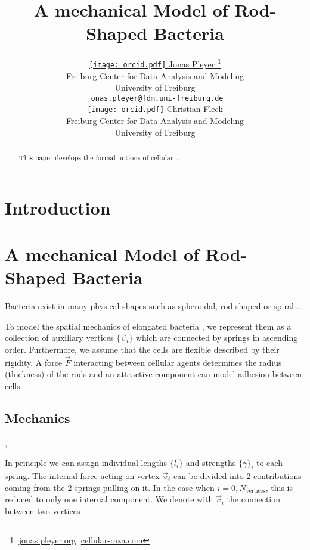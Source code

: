 \documentclass{article}
\title{
    A mechanical Model of Rod-Shaped Bacteria
}
\author{
    \href{https://orcid.org/0009-0001-0613-7978}{
        \texttt{[image: orcid.pdf]}
        \hspace{1mm}Jonas Pleyer
    }
    \thanks{
        \href{https://jonas.pleyer.org}{jonas.pleyer.org},
        \href{https://cellular-raza.com}{cellular-raza.com}
    }\\
	Freiburg Center for Data-Analysis and Modeling\\
	University of Freiburg\\
	\texttt{jonas.pleyer@fdm.uni-freiburg.de} \\
	\And
	\href{https://orcid.org/0000-0002-6371-4495}{
        \texttt{[image: orcid.pdf]}
        \hspace{1mm}Christian Fleck
    }\\
	Freiburg Center for Data-Analysis and Modeling\\
	University of Freiburg
}
\begin{document}
\maketitle

\begin{abstract}
    This paper develops the formal notions of cellular \dots
\end{abstract}


\section{Introduction}
\label{section:introduction}

\section{A mechanical Model of Rod-Shaped Bacteria}
\label{section:mechanical-model-rod-shaped-bacteria}

Bacteria exist in many physical shapes such as spheroidal, rod-shaped or spiral
\cite{Zapun2008,Young2006}.

To model the spatial mechanics of elongated bacteria \cite{Billaudeau2017}, we represent them as a
collection of auxiliary vertices $\{\vec{v}_i\}$ which are connected by springs in
ascending order.
Furthermore, we assume that the cells are flexible described by their rigidity.
A force $\vec{F}$ interacting between cellular agents determines the radius (thickness) of the
rods and an attractive component can model adhesion between cells.

\subsection{Mechanics}

\cite{Chatterjee1988},\cite{Ursell2014}

In principle we can assign individual lengths $\{l_i\}$ and strengths $\{\gamma\}_i$ to each spring.
The internal force acting on vertex $\vec{v}_i$ can be divided into 2 contributions coming
from the 2 springs pulling on it.
In the case when $i=0,N_\text{vertices}$, this is reduced to only one internal component.
We denote with $\vec{c}_{i}$ the connection between two vertices
\end{document}
